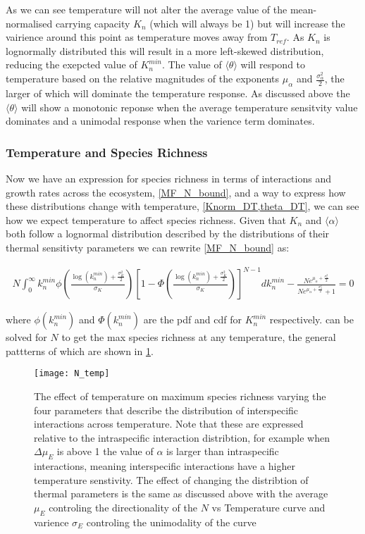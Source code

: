 \documentclass{article}
\begin{document}
As we can see temperature will not alter the average value of the mean-normalised carrying capacity $K_n$ (which will always be 1) but will increase the vairience around this point as temperature moves away from $T_{ref}$. As $K_n$ is lognormally distributed this will result in a more left-skewed distribution, reducing the exepcted value of $K_n^{min}$. The value of $\langle \theta \rangle$ will respond to temperature based on the relative magnitudes of the exponents $\mu_{\alpha}$ and $\frac{\sigma_{\alpha}^2}{2}$, the larger of which will dominate the temperature response. As discussed above the $\langle \theta \rangle$ will show a monotonic reponse when the average temperature sensitvity value dominates and a unimodal response when the varience term dominates.

\subsubsection{Temperature and Species Richness}

Now we have an expression for species richness in terms of interactions and growth rates across the ecosystem, \cref{MF_N_bound}, and a way to express how these distributions change with temperature, \cref{Knorm_DT,theta_DT}, we can see how we expect temperature to affect species richness. Given that $K_n$ and $\langle \alpha \rangle$ both follow a lognormal distribution described by the distributions of their thermal sensitivty parameters we can rewrite \cref{MF_N_bound} as:

\begin{align}
  N \int_{0}^{\infty} k_n^{min} \phi \left(\frac{\log(k_n^{min}) + \frac{\sigma_K^2}{2}}{\sigma_K} \right)
  \left[1 - \Phi\left(\frac{\log(k_n^{min}) + \frac{\sigma_K^2}{2}}{\sigma_K} \right) \right]^{N-1} dk_n^{min} -
  \frac{N e^{ \mu_{\alpha} + \frac{\sigma_{\alpha}^2}{2} }}{N e^{ \mu_{\alpha} + \frac{\sigma_{\alpha}^2}{2} } + 1} = 0 \label{T_sp_rich}
\end{align}

where $\phi(k_n^{min})$ and $\Phi(k_n^{min})$ are the pdf and cdf for $K_n^{min}$ respectively.  can be solved for $N$ to get the max species richness at any temperature, the general pattterns of which are shown in \cref{N_temp}.

\begin{figure}
  \texttt{[image: N\_temp]}
  \centering
  \caption{The effect of temperature on maximum species richness varying the four parameters that describe the distribution of interspecific interactions across temperature. Note that these are expressed relative to the intraspecific interaction distribtion, for example when $\Delta\mu_E$ is above 1 the value of $\alpha$ is larger than intraspecific interactions, meaning interspecific interactions have a higher temperature senstivity. The effect of changing the distribtion of thermal parameters is the same as discussed above with the average $\mu_E$ controling the directionality of the $N$ vs Temperature curve and varience $\sigma_E$ controling the unimodality of the curve  }
  \label{N_temp}
\end{figure}
\end{document}
